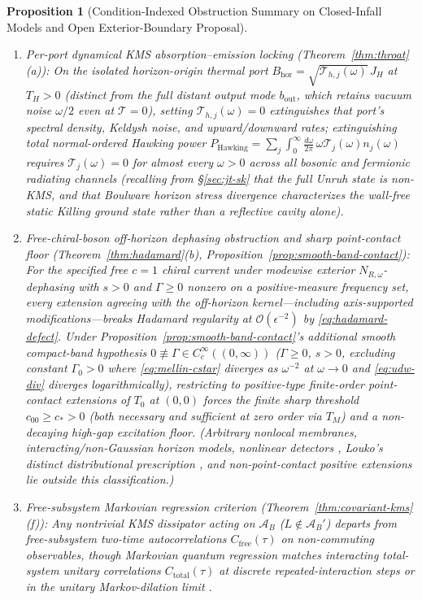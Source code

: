 \documentclass[11pt,a4paper]{article}
\newtheorem{proposition}{Proposition}
\theoremstyle{definition}
\theoremstyle{remark}
\newcommand{\cA}{\mathcal{A}}
\newcommand{\cT}{\mathcal{T}}
\newcommand{\1}{\mathbf{1}}
\begin{document}
\begin{proposition}[Condition-Indexed Obstruction Summary on Closed-Infall Models and Open Exterior-Boundary Proposal]
\begin{enumerate}
\begin{enumerate}
    \item \emph{Per-port dynamical KMS absorption--emission locking (Theorem~\ref{thm:throat}(a)):} On the isolated horizon-origin thermal port $B_{\mathrm{hor}}=\sqrt{\cT_{h,j}(\omega)}\,J_H$ at $T_H>0$ (distinct from the full distant output mode $b_{\mathrm{out}}$, which retains vacuum noise $\omega/2$ even at $\cT=0$), setting $\cT_{h,j}(\omega)=0$ extinguishes that port's spectral density, Keldysh noise, and upward/downward rates; extinguishing total normal-ordered Hawking power $P_{\mathrm{Hawking}}=\sum_j\int_0^\infty\frac{d\omega}{2\pi}\,\omega\cT_j(\omega)n_j(\omega)$ requires $\cT_j(\omega)=0$ for almost every $\omega>0$ across \emph{all} bosonic and fermionic radiating channels (recalling from \S\ref{sec:jt-sk} that the full Unruh state is non-KMS, and that Boulware horizon stress divergence \cite{Boulware1975,Candelas1980} characterizes the wall-free static Killing ground state rather than a reflective cavity alone).
    \item \emph{Free-chiral-boson off-horizon dephasing obstruction and sharp point-contact floor (Theorem~\ref{thm:hadamard}(b), Proposition~\ref{prop:smooth-band-contact}):} For the specified free $c=1$ chiral current under modewise exterior $N_{R,\omega}$-dephasing with $s>0$ and $\Gamma\ge 0$ nonzero on a positive-measure frequency set, \emph{every} extension agreeing with the off-horizon kernel---including axis-supported modifications---breaks Hadamard regularity at $\mathcal{O}(\epsilon^{-2})$ by \eqref{eq:hadamard-defect}. Under Proposition~\ref{prop:smooth-band-contact}'s additional smooth compact-band hypothesis $0\not\equiv\Gamma\in C_c^\infty((0,\infty))$ ($\Gamma\ge 0$, $s>0$, excluding constant $\Gamma_0>0$ where \eqref{eq:mellin-cstar} diverges as $\omega^{-2}$ at $\omega\to 0$ and \eqref{eq:udw-div} diverges logarithmically), restricting to positive-type finite-order point-contact extensions of $T_0$ at $(0,0)$ forces the finite sharp threshold $c_{00}\ge c_* > 0$ (both necessary and sufficient at zero order via $T_M$) and a non-decaying high-gap excitation floor. (Arbitrary nonlocal membranes, interacting/non-Gaussian horizon models, nonlinear detectors \cite{Zambianco2026}, Louko's distinct distributional prescription \cite{Louko2014}, and non-point-contact positive extensions lie outside this classification.)
    \item \emph{Free-subsystem Markovian regression criterion (Theorem~\ref{thm:covariant-kms}(f)):} Any nontrivial KMS dissipator acting on $\cA_B$ ($L\notin\cA_B'$) departs from \emph{free-subsystem} two-time autocorrelations $C_{\mathrm{free}}(\tau)$ on non-commuting observables, though Markovian quantum regression matches interacting total-system unitary correlations $C_{\mathrm{total}}(\tau)$ at discrete repeated-interaction steps or in the unitary Markov-dilation limit \cite{Frigerio1985,AttalJoye2007}.

\end{enumerate}
\end{enumerate}
\end{proposition}
\end{document}
